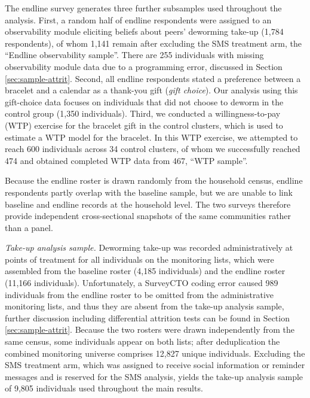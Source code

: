 \documentclass[12pt,a4paper]{article}
\begin{document}
The endline survey generates three further subsamples used throughout the
analysis.  First, a random half of endline respondents were assigned to an
observability module eliciting beliefs about peers' deworming take-up (1{,}784
respondents), of whom 1{,}141 remain after excluding the SMS treatment arm,
the ``Endline observability sample''. There are 255 individuals with
missing observability module data due to a programming error, discussed in Section \ref{sec:sample-attrit}.  Second, all endline respondents stated a preference between a
bracelet and a calendar as a thank-you gift (\emph{gift choice}).  Our analysis 
using this gift-choice data focuses on individuals that did not choose to deworm
in the control group (1{,}350 individuals). Third, we conducted a
willingness-to-pay (WTP) exercise for the bracelet gift in the control clusters,
which is used to estimate a WTP model for the bracelet.  In this WTP exercise,
we attempted to reach 600 individuals across 34 control clusters, of whom we
successfully reached 474 and obtained completed WTP data from 467, ``WTP sample''.


Because the endline roster is drawn randomly from the household census, endline
respondents partly overlap with the baseline sample, but we are unable to link
baseline and endline records at the household level.  The two surveys therefore
provide independent cross-sectional snapshots of the same communities rather
than a panel.


\emph{Take-up analysis sample.}
Deworming take-up was recorded administratively at points of treatment for all
individuals on the monitoring lists, which were assembled from the baseline
roster (4{,}185 individuals) and the endline roster (11{,}166 individuals). Unfortunately, 
a SurveyCTO coding error caused 989 individuals from the endline roster to be omitted from the 
administrative monitoring lists, and thus they are absent from the take-up analysis sample, further discussion including differential attrition tests can be found in Section \ref{sec:sample-attrit}.
Because the two rosters were drawn independently from the same census, some
individuals appear on both lists; after deduplication the combined monitoring
universe comprises 12{,}827 unique individuals.
Excluding the SMS treatment arm, which was assigned to receive social
information or reminder messages and is reserved for the SMS analysis, yields
the take-up analysis sample of 9{,}805 individuals used throughout the
main results.
\end{document}
